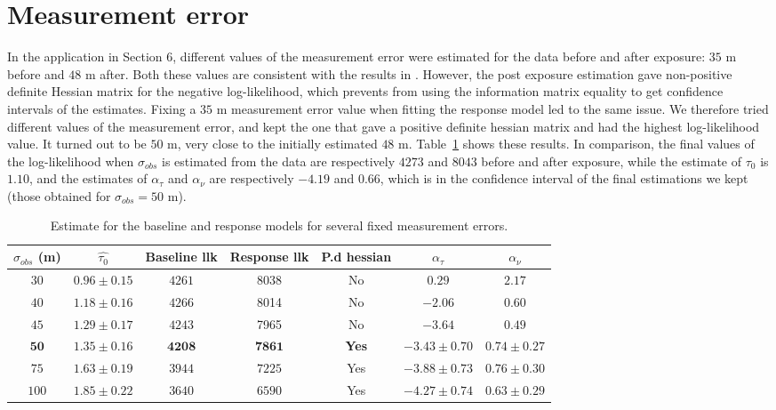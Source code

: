 \documentclass[aoas]{imsart}
\theoremstyle{definition}
\theoremstyle{remark}
\theoremstyle{remark}
\newcommand {\1}{\mathbb{1}}
\begin{document}
\section{Measurement error}

In the application in Section 6, different values of the measurement error were estimated for the data before and after exposure: $35$ m before and $48$ m after. Both these values are consistent with the results in \citep{wensveen_path_2015}. However, the post exposure estimation gave non-positive definite Hessian matrix for the negative log-likelihood, which prevents from using the information matrix equality to get confidence intervals of the estimates. Fixing a $35$ m measurement error value when fitting the response model led to the same issue. We therefore tried different values of the measurement error, and kept the one that gave a positive definite hessian matrix and had the highest log-likelihood value. It turned out to be $50$ m, very close to the initially estimated $48$ m. Table~\ref{tab: estimates for fixed measurement errors} shows these results. In comparison, the final values of the log-likelihood when $\sigma_{obs}$ is estimated from the data are respectively $4273$ and $8043$ before and after exposure, while the estimate of $\tau_0$ is $1.10$, and the estimates of $\alpha_\tau$ and $\alpha_\nu$ are respectively $-4.19$ and $0.66$, which is in the confidence interval of the final estimations we kept (those obtained for $\sigma_{obs}=50$ m).
\begin{table}[ht!]
	\centering
	\begin{tabular}{|c|c|c|c|c|c|c|}
		\hline
		$\sigma_{obs}$ (m) & $\hat{\tau_0}$ & Baseline llk & Response llk & P.d hessian & $\alpha_{\tau}$ & $\alpha_\nu$ \\
		\hline
		$30$  & $0.96 \pm 0.15$ & $4261$  & 8038 & No & $0.29$ & $2.17$ \\
		\hline
		$40$  & $1.18 \pm 0.16$   & $4266$ & 8014  & No  & $-2.06$ & $0.60$\\
		\hline
		$45$  & $1.29 \pm 0.17$   & $4243$ & 7965  & No & $-3.64$ & $0.49$\\
		\hline
		$\mathbf{50}$  & $\mathbf{1.35 \pm 0.16}$ & $\mathbf{4208}$ & $\mathbf{7861}$ & \textbf{Yes} & $\mathbf{-3.43 \pm 0.70}$ & $\mathbf{0.74 \pm 0.27}$\\
		\hline
		$75$ &  $1.63 \pm 0.19$ & $3944$ & $7225$ & Yes & $-3.88 \pm 0.73$ & $0.76 \pm 0.30$\\
		\hline 
		$100$ & $1.85 \pm 0.22$ & $3640$ & $6590$ & Yes & $-4.27 \pm 0.74$ & $0.63 \pm 0.29$ \\
		\hline 
	\end{tabular}
	\caption{Estimate for the baseline and response models for several fixed measurement errors.}
	\label{tab: estimates for fixed measurement errors}
\end{table}
\end{document}
